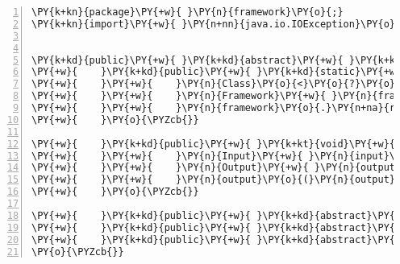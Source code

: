 \begin{Verbatim}[commandchars=\\\{\},numbers=left,firstnumber=1,stepnumber=1,frame=single,fontsize=\small]
\PY{k+kn}{package}\PY{+w}{ }\PY{n}{framework}\PY{o}{;}
\PY{k+kn}{import}\PY{+w}{ }\PY{n+nn}{java.io.IOException}\PY{o}{;}


\PY{k+kd}{public}\PY{+w}{ }\PY{k+kd}{abstract}\PY{+w}{ }\PY{k+kd}{class}\PY{+w}{ }\PY{n+nc}{Framework}\PY{+w}{ }\PY{o}{\PYZob{}}
\PY{+w}{    }\PY{k+kd}{public}\PY{+w}{ }\PY{k+kd}{static}\PY{+w}{ }\PY{k+kt}{void}\PY{+w}{ }\PY{n+nf}{main}\PY{o}{(}\PY{n}{String}\PY{o}{[}\PY{o}{]}\PY{+w}{ }\PY{n}{args}\PY{o}{)}\PY{+w}{ }\PY{k+kd}{throws}\PY{+w}{ }\PY{n}{Exception}\PY{+w}{ }\PY{o}{\PYZob{}}
\PY{+w}{    }\PY{+w}{    }\PY{n}{Class}\PY{o}{<}\PY{o}{?}\PY{o}{>}\PY{+w}{ }\PY{n}{c}\PY{+w}{ }\PY{o}{=}\PY{+w}{ }\PY{n}{Class}\PY{o}{.}\PY{n+na}{forName}\PY{o}{(}\PY{n}{args}\PY{o}{[}\PY{l+m+mi}{0}\PY{o}{]}\PY{o}{)}\PY{o}{;}
\PY{+w}{    }\PY{+w}{    }\PY{n}{Framework}\PY{+w}{ }\PY{n}{framework}\PY{+w}{ }\PY{o}{=}\PY{+w}{ }\PY{o}{(}\PY{n}{Framework}\PY{o}{)}\PY{+w}{ }\PY{n}{c}\PY{o}{.}\PY{n+na}{newInstance}\PY{o}{(}\PY{o}{)}\PY{o}{;}
\PY{+w}{    }\PY{+w}{    }\PY{n}{framework}\PY{o}{.}\PY{n+na}{run}\PY{o}{(}\PY{o}{)}\PY{o}{;}
\PY{+w}{    }\PY{o}{\PYZcb{}}

\PY{+w}{    }\PY{k+kd}{public}\PY{+w}{ }\PY{k+kt}{void}\PY{+w}{ }\PY{n+nf}{run}\PY{o}{(}\PY{o}{)}\PY{+w}{ }\PY{k+kd}{throws}\PY{+w}{ }\PY{n}{Exception}\PY{+w}{ }\PY{o}{\PYZob{}}
\PY{+w}{    }\PY{+w}{    }\PY{n}{Input}\PY{+w}{ }\PY{n}{input}\PY{+w}{ }\PY{o}{=}\PY{+w}{ }\PY{n}{input}\PY{o}{(}\PY{o}{)}\PY{o}{;}
\PY{+w}{    }\PY{+w}{    }\PY{n}{Output}\PY{+w}{ }\PY{n}{output}\PY{+w}{ }\PY{o}{=}\PY{+w}{ }\PY{n}{process}\PY{o}{(}\PY{n}{input}\PY{o}{)}\PY{o}{;}
\PY{+w}{    }\PY{+w}{    }\PY{n}{output}\PY{o}{(}\PY{n}{output}\PY{o}{)}\PY{o}{;}
\PY{+w}{    }\PY{o}{\PYZcb{}}

\PY{+w}{    }\PY{k+kd}{public}\PY{+w}{ }\PY{k+kd}{abstract}\PY{+w}{ }\PY{n}{Input}\PY{+w}{ }\PY{n+nf}{input}\PY{o}{(}\PY{o}{)}\PY{+w}{ }\PY{k+kd}{throws}\PY{+w}{ }\PY{n}{IOException}\PY{o}{;}
\PY{+w}{    }\PY{k+kd}{public}\PY{+w}{ }\PY{k+kd}{abstract}\PY{+w}{ }\PY{n}{Output}\PY{+w}{ }\PY{n+nf}{process}\PY{o}{(}\PY{n}{Input}\PY{+w}{ }\PY{n}{input}\PY{o}{)}\PY{o}{;}
\PY{+w}{    }\PY{k+kd}{public}\PY{+w}{ }\PY{k+kd}{abstract}\PY{+w}{ }\PY{k+kt}{void}\PY{+w}{ }\PY{n+nf}{output}\PY{o}{(}\PY{n}{Output}\PY{+w}{ }\PY{n}{output}\PY{o}{)}\PY{o}{;}
\PY{o}{\PYZcb{}}
\end{Verbatim}
